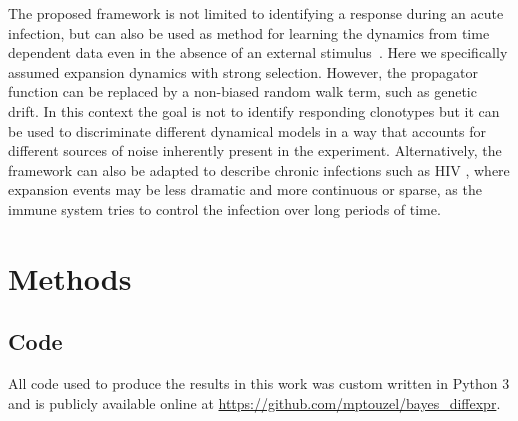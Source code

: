 \documentclass[pre,twocolumn,english,longbibliography]{revtex4}
\newcommand{\<}{\langle}
\renewcommand{\>}{\rangle}
\begin{document}
The proposed framework is not limited to identifying a response during an acute infection, but can also be used as method for learning the dynamics from time dependent data even in the absence of an external stimulus~\cite{Chu2019}. Here we specifically assumed expansion dynamics with strong selection. However, the propagator function can be replaced by a non-biased random walk term, such as genetic drift. In this context the goal is not to identify responding clonotypes but it can be used to discriminate different dynamical models in a way that accounts for different sources of noise inherently present in the experiment. Alternatively, the framework can also be adapted to describe chronic infections such as HIV \cite{Nourmohammad2019}, where expansion events may be less dramatic and more continuous or sparse, as the immune system tries to control the infection over long periods of time.



\section*{Methods}

\subsection*{Code}
All code used to produce the results in this work was custom written in Python 3 and is publicly available online at \url{https://github.com/mptouzel/bayes_diffexpr}.
\end{document}
